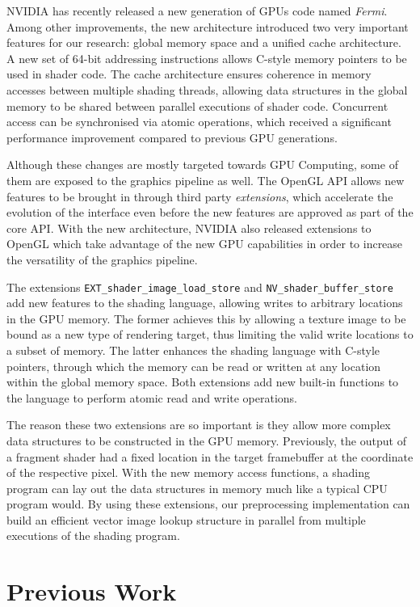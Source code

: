 \documentclass[11pt,a4paper,twoside]{article}
\begin{document}
NVIDIA has recently released a new generation of GPUs code named \emph{Fermi}. Among other improvements, the new architecture introduced two very important features for our research: global memory space and a unified cache architecture. A new set of 64-bit addressing instructions allows C-style memory pointers to be used in shader code. The cache architecture ensures coherence in memory accesses between multiple shading threads, allowing data structures in the global memory to be shared between parallel executions of shader code. Concurrent access can be synchronised via atomic operations, which received a significant performance improvement compared to previous GPU generations.

Although these changes are mostly targeted towards GPU Computing, some of them are exposed to the graphics pipeline as well. The OpenGL API allows new features to be brought in through third party \emph{extensions}, which accelerate the evolution of the interface even before the new features are approved as part of the core API. With the new architecture, NVIDIA also released extensions to OpenGL which take advantage of the new GPU capabilities in order to increase the versatility of the graphics pipeline.

The extensions {\tt EXT\_shader\_image\_load\_store} and {\tt NV\_shader\_buffer\_store} add new features to the shading language, allowing writes to arbitrary locations in the GPU memory. The former achieves this by allowing a texture image to be bound as a new type of rendering target, thus limiting the valid write locations to a subset of memory. The latter enhances the shading language with C-style pointers, through which the memory can be read or written at any location within the global memory space. Both extensions add new built-in functions to the language to perform atomic read and write operations.

The reason these two extensions are so important is they allow more complex data structures to be constructed in the GPU memory. Previously, the output of a fragment shader had a fixed location in the target framebuffer at the coordinate of the respective pixel. With the new memory access functions, a shading program can lay out the data structures in memory much like a typical CPU program would. By using these extensions, our preprocessing implementation can build an efficient vector image lookup structure in parallel from multiple executions of the shading program.

\section {Previous Work}
\end{document}
